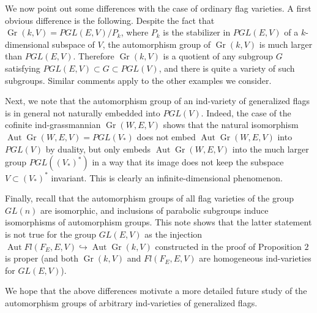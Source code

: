 \documentclass[11pt]{amsart}
\numberwithin{equation}{section}
\theoremstyle{plain}
\theoremstyle{remark}
\theoremstyle{remark}
\theoremstyle{construction}
\begin{document}
We now point out some differences with the case of ordinary flag varieties. A first obvious difference is the following. Despite the fact that $\operatorname{Gr}(k,V)=PGL(E,V)/P_k$, where $P_k$ is the stabilizer in $PGL(E,V)$ of a $k$-dimensional subspace of $V$, the automorphism group of $\operatorname{Gr}(k,V)$ is much larger than $PGL(E,V)$. Therefore $\operatorname{Gr}(k,V)$ is a quotient of any subgroup $G$ satisfying $PGL(E,V)\subset G\subset PGL(V)$, and there is quite a variety of such subgroups. Similar comments apply to the other examples we consider.

Next, we note that the automorphism group of an ind-variety of generalized flags is in general not naturally embedded into $PGL(V)$. Indeed, the case of the cofinite ind-grassmannian $\operatorname{Gr}(W,E,V)$ shows that the natural isomorphism $\operatorname{Aut}\operatorname{Gr}(W,E,V)= PGL(V_*)$ does not embed $\operatorname{Aut}\operatorname{Gr}(W,E,V)$ into $PGL(V)$ by duality, but only embeds $\operatorname{Aut}\operatorname{Gr}(W,E,V)$ into the much larger group $PGL((V_*)^*)$ in a way that its image does not keep the subspace $V\subset(V_*)^*$ invariant. This is  clearly an infinite-dimensional phenomenon.


Finally, recall that the automorphism groups of all flag varieties of the group $GL(n)$ are isomorphic, and inclusions of parabolic subgroups induce isomorphisms of automorphism groups. This note shows that the latter statement is not true for the group $GL(E,V)$  as the injection $\operatorname{Aut}Fl(F_E,E,V)\hookrightarrow \operatorname{Aut}\operatorname{Gr}(k,V)$ constructed in the proof of Proposition $2$ is proper (and both   $\operatorname{Gr}(k,V)$ and $Fl(F_E,E,V)$ are homogeneous ind-varieties for $GL(E,V)$). 

We hope that the above differences motivate a more detailed future study of the automorphism groups of arbitrary ind-varieties of generalized flags.
\end{document}
